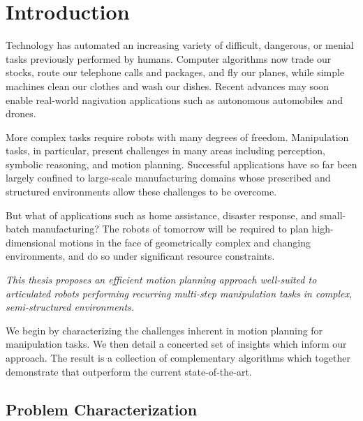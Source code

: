 \chapter{Introduction}
\label{chap:intro}


Technology has automated an increasing variety of
difficult, dangerous, or menial tasks
previously performed by humans.
Computer algorithms now trade our stocks,
route our telephone calls and packages,
and fly our planes,
while simple machines clean our clothes and wash our dishes.
Recent advances may soon enable real-world nagivation applications
such as autonomous automobiles and drones.

More complex tasks require robots with many degrees of freedom.
Manipulation tasks, in particular,
present challenges in many areas including
perception, symbolic reasoning, and motion planning.
Successful applications have so far been largely
confined to large-scale manufacturing domains
whose prescribed and structured environments
allow these challenges to be overcome.

But what of applications such as
home assistance, disaster response, and small-batch manufacturing?
The robots of tomorrow will be required to plan
high-dimensional motions
in the face of geometrically complex and changing environments,
and do so under significant resource constraints.


\vspace{0.2cm}
\begin{adjustwidth}{0.2in}{0.1in}
\emph{\large%
This thesis proposes an
efficient motion planning approach
well-suited
to articulated robots
performing recurring multi-step manipulation tasks
in complex, semi-structured environments.
}
\end{adjustwidth}
\vspace{0.2cm}

We begin by characterizing the challenges inherent in
motion planning for manipulation tasks.
We then detail a concerted set of insights which inform our approach.
The result is a collection of complementary algorithms
which together demonstrate that outperform
the current state-of-the-art.

\section{Problem Characterization}

